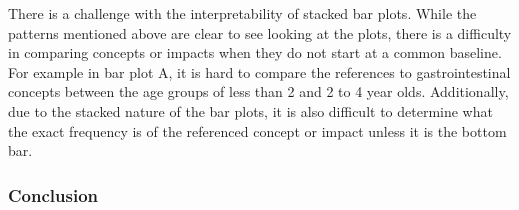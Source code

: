 \documentclass[
]{article}
\begin{document}
There is a challenge with the interpretability of stacked bar plots. While the patterns mentioned above are clear to see looking at the plots, there is a difficulty in comparing concepts or impacts when they do not start at a common baseline. For example in bar plot A, it is hard to compare the references to gastrointestinal concepts between the age groups of less than 2 and 2 to 4 year olds. Additionally, due to the stacked nature of the bar plots, it is also difficult to determine what the exact frequency is of the referenced concept or impact unless it is the bottom bar.

\hypertarget{conclusion}{%
\subsubsection{Conclusion}\label{conclusion}}
\end{document}
